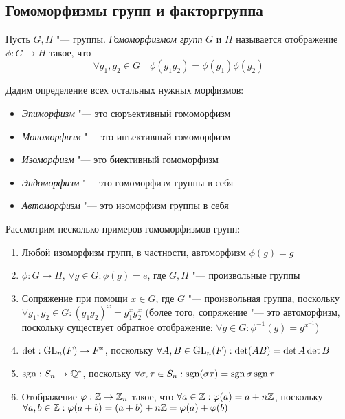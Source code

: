 \subsection{Гомоморфизмы групп и факторгруппа}

\begin{definition}
	Пусть $G, H$ "--- группы. \textit{Гомоморфизмом групп} $G$ и $H$ называется отображение $\phi \colon G \to H$ такое, что
	\[
		\forall g_1, g_2 \in G \quad\phi(g_1g_2) = \phi(g_1)\phi(g_2)
	\]
\end{definition}

\begin{note}
	Дадим определение всех остальных нужных морфизмов:
	\begin{itemize}
		\item \textit{Эпиморфизм} "--- это сюръективный гомоморфизм
		
		\item \textit{Мономорфизм} "--- это инъективный гомоморфизм
		
		\item \textit{Изоморфизм} "--- это биективный гомоморфизм
		
		\item \textit{Эндоморфизм} "--- это гомоморфизм группы в себя
		
		\item \textit{Автоморфизм} "--- это изоморфизм группы в себя
	\end{itemize}
\end{note}

\begin{example}
	Рассмотрим несколько примеров гомоморфизмов групп:
	\begin{enumerate}
		\item Любой изоморфизм групп, в частности, автоморфизм $\phi(g) = g$
		
		\item $\phi: G \to H$, $\forall g \in G: \phi(g) = e$, где $G, H$ "--- произвольные группы
		
		\item Сопряжение при помощи $x \in G$, где $G$ "--- произвольная группа, поскольку $\forall g_1, g_2 \in G: (g_1g_2)^x = g_1^xg_2^x$ (более того, сопряжение "--- это автоморфизм, поскольку существует обратное отображение: $\forall g \in G: \phi^{-1}(g) = g^{x^{-1}}$)
		
		\item $\det: \operatorname{GL}_n(F) \to F^*$, поскольку $\forall A, B \in \operatorname{GL}_n(F): \det(AB) = \det A \det B$
		
		\item $\operatorname{\mathop{sgn}}: S_n \to \mathbb{Q}^*$, поскольку $\forall \sigma, \tau \in S_n: \operatorname{\mathop{sgn}}(\sigma\tau) = \operatorname{\mathop{sgn}}\sigma\operatorname{\mathop{sgn}}\tau$
		
		\item Отображение $\varphi: \mathbb{Z} \to \mathbb{Z}_n$ такое, что $\forall a \in \mathbb{Z}: \varphi(a) = a + n\mathbb{Z}$, поскольку $\forall a, b \in \mathbb{Z}: \varphi(a + b) = (a + b) + n\mathbb{Z} = \varphi(a) + \varphi(b)$
	\end{enumerate}
\end{example}

